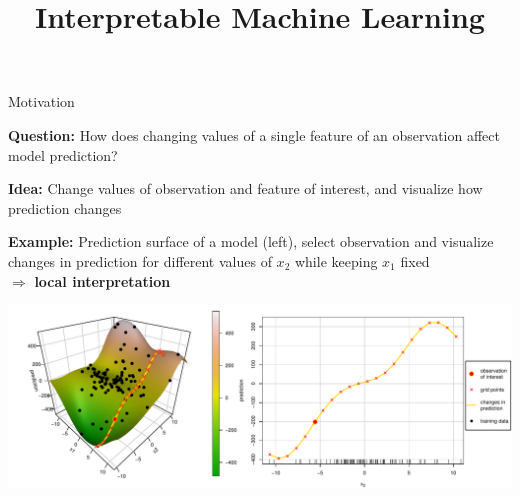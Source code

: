\documentclass[11pt,compress,t,notes=noshow, aspectratio=169, xcolor=table]{beamer}
\title{Interpretable Machine Learning}
\date{}
\begin{document}
\newcommand{\titlefigure}{figure/feature-effect}
\newcommand{\learninggoals}{
\item ICE curves as local effect method
\item How to sample grid points for ICE curves
}



\begin{frame}{Motivation}

\textbf{Question:} How does changing values of a single feature of an observation affect model prediction?

\smallskip

\textbf{Idea:} Change values of observation and feature of interest, and visualize how prediction changes

\smallskip

\textbf{Example:} Prediction surface of a model (left), select observation and visualize changes in prediction for different values of $x_2$ while keeping $x_1$ fixed \\ $\Rightarrow$ \textbf{local interpretation}

\bigskip
\centering
\includegraphics[width=\textwidth]{figure/ice_motivation}

\end{frame}
\end{document}
